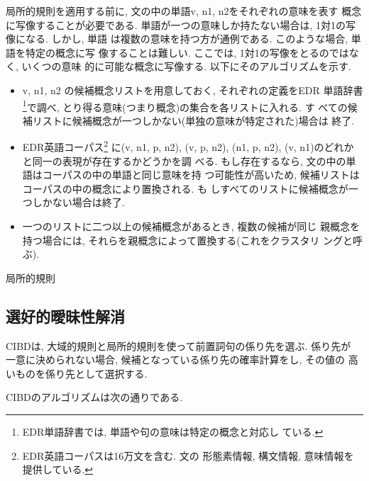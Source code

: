 局所的規則を適用する前に, 文の中の単語v, n1, n2をそれぞれの意味を表す
概念に写像することが必要である. 
単語が一つの意味しか持たない場合は, 1対1の写像になる. しかし, 単語
は複数の意味を持つ方が通例である. このような場合, 単語を特定の概念に写
像することは難しい. ここでは, 1対1の写像をとるのではなく, いくつの意味
的に可能な概念に写像する. 以下にそのアルゴリズムを示す. 

\vspace*{5mm}
\begin{itemize}
\item[1.] v, n1, n2 の候補概念リストを用意しておく, それぞれの定義をEDR
単語辞書\footnote {EDR単語辞書では, 単語や句の意味は特定の概念と対応し
ている. }で調べ, とり得る意味(つまり概念)の集合を各リストに入れる. す
べての候補リストに候補概念が一つしかない(単独の意味が特定された)場合は
終了. 
\item[2.] EDR英語コーパス\footnote{EDR英語コーパスは16万文を含む. 文の
形態素情報, 構文情報, 意味情報を提供している. } に(v, n1, p, n2), (v,
p, n2), (n1, p, n2), (v, n1)のどれかと同一の表現が存在するかどうかを調
べる. もし存在するなら, 文の中の単語はコーパスの中の単語と同じ意味を持
つ可能性が高いため, 候補リストはコーパスの中の概念により置換される. も
しすべてのリストに候補概念が一つしかない場合は終了. 
\item[3.] 一つのリストに二つ以上の候補概念があるとき, 複数の候補が同じ
親概念を持つ場合には, それらを親概念によって置換する(これをクラスタリ
ングと呼ぶ). 
\end{itemize}

\clearpage

\begin{table}
\caption{局所的規則}
 \begin{center}
  
 \end{center}
\end{table}

\clearpage

\subsection{選好的曖昧性解消}

CIBDは, 大域的規則と局所的規則を使って前置詞句の係り先を選ぶ. 係り先が
一意に決められない場合, 候補となっている係り先の確率計算をし, その値の
高いものを係り先として選択する. 

CIBDのアルゴリズムは次の通りである. 

\vspace*{3mm}

